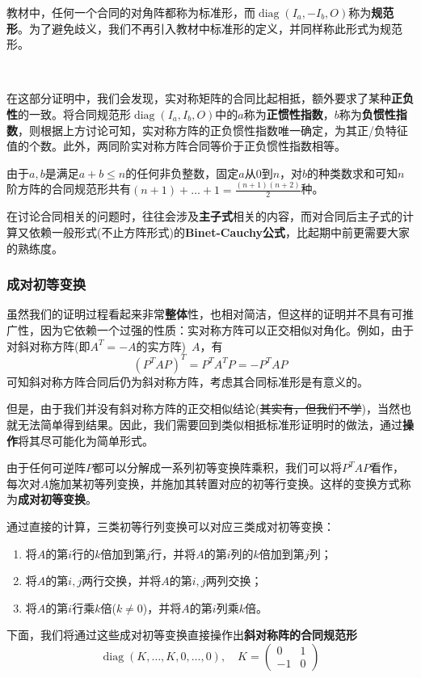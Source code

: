 \documentclass[a4paper,UTF8,fontset=windows]{ctexart}
\DeclareMathOperator{\diag}{diag}
\newcommand*{\note}{\noindent *}
\begin{document}
\note 教材中，任何一个合同的对角阵都称为标准形，而$\diag(I_a,-I_b,O)$称为\textbf{规范形}。为了避免歧义，我们不再引入教材中标准形的定义，并同样称此形式为规范形。

\

在这部分证明中，我们会发现，实对称矩阵的合同比起相抵，额外要求了某种\textbf{正负性}的一致。将合同规范形$\diag(I_a,I_b,O)$中的$a$称为\textbf{正惯性指数}，$b$称为\textbf{负惯性指数}，则根据上方讨论可知，实对称方阵的正负惯性指数唯一确定，为其正/负特征值的个数。此外，两同阶实对称方阵合同等价于正负惯性指数相等。

\note 由于$a,b$是满足$a+b\le n$的任何非负整数，固定$a$从0到$n$，对$b$的种类数求和可知$n$阶方阵的合同规范形共有$(n+1)+\dots+1=\frac{(n+1)(n+2)}{2}$种。

\note 在讨论合同相关的问题时，往往会涉及\textbf{主子式}相关的内容，而对合同后主子式的计算又依赖一般形式(不止方阵形式)的\textbf{Binet-Cauchy公式}，比起期中前更需要大家的熟练度。

\subsubsection{成对初等变换}
虽然我们的证明过程看起来非常\textbf{整体}性，也相对简洁，但这样的证明并不具有可推广性，因为它依赖一个过强的性质：实对称方阵可以正交相似对角化。例如，由于对斜对称方阵(即$A^T=-A$的实方阵)\ $A$，有
$$(P^TAP)^T=P^TA^TP=-P^TAP$$
可知斜对称方阵合同后仍为斜对称方阵，考虑其合同标准形是有意义的。

但是，由于我们并没有斜对称方阵的正交相似结论(\sout{其实有，但我们不学})，当然也就无法简单得到结果。因此，我们需要回到类似相抵标准形证明时的做法，通过\textbf{操作}将其尽可能化为简单形式。

由于任何可逆阵$P$都可以分解成一系列初等变换阵乘积，我们可以将$P^TAP$看作，每次对$A$施加某初等列变换，并施加其转置对应的初等行变换。这样的变换方式称为\textbf{成对初等变换}。

通过直接的计算，三类初等行列变换可以对应三类成对初等变换：
\begin{enumerate}
    \item 将$A$的第$i$行的$k$倍加到第$j$行，并将$A$的第$i$列的$k$倍加到第$j$列；
    \item 将$A$的第$i,j$两行交换，并将$A$的第$i,j$两列交换；
    \item 将$A$的第$i$行乘$k$倍($k\ne0$)，并将$A$的第$i$列乘$k$倍。
\end{enumerate}
下面，我们将通过这些成对初等变换直接操作出\textbf{斜对称阵的合同规范形}
$$\diag(K,\dots,K,0,\dots,0),\quad K=\begin{pmatrix}0&1\\-1&0\end{pmatrix}$$
\end{document}
